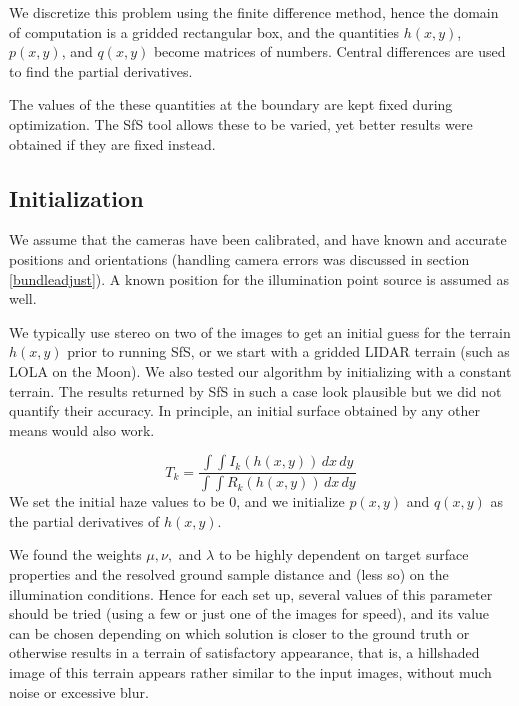 \documentclass[draft,linenumbers]{agujournal}
\begin{document}
We discretize this problem using the finite difference method, hence the
domain of computation is a gridded rectangular box, and the quantities $h(x,y)$, $p(x,y)$, and $q(x, y)$
become matrices of numbers. Central differences are used to find
the partial derivatives.

The values of the these quantities at the boundary are kept fixed during optimization. The SfS tool allows these to be varied, yet better results were obtained if they are fixed instead.

\subsection{Initialization}

We assume that the cameras have been calibrated, and have known and accurate 
positions and orientations (handling camera errors was discussed in section \ref{bundleadjust}). 
A known position for the illumination point source is assumed as
well.

We typically use stereo on two of the images to get an initial guess
for the terrain $h(x, y)$ prior to running SfS, or we start with a
gridded LIDAR terrain (such as LOLA on the Moon). We also tested
our algorithm by initializing with a constant terrain. The results
returned by SfS in such a case look plausible but we did not quantify
their accuracy. In principle, an initial surface obtained by any
other means would also work.


\begin{equation}
T_k = \frac{ \int\!\! \int \! I_k(h(x, y)) \,dx\,dy }{ \int\!\! \int \! R_k(h(x, y)) \,dx\,dy}
\end{equation}
We set the initial haze values to be 0, and we initialize $p(x, y)$ and $q(x, y)$ as the partial derivatives of
$h(x, y)$. 

We found the weights $\mu, \nu,$ and $\lambda$ to be highly dependent 
on target surface properties and the resolved ground sample 
distance and (less so) on the illumination
conditions. Hence for each set up, several values of this parameter
should be tried (using a few or just one of the images for speed),
and its value can be chosen depending on which solution is closer
to the ground truth or otherwise results in a terrain of satisfactory
appearance, that is, a hillshaded image of this terrain appears
rather similar to the input images, without much noise or excessive
blur. 
\end{document}
